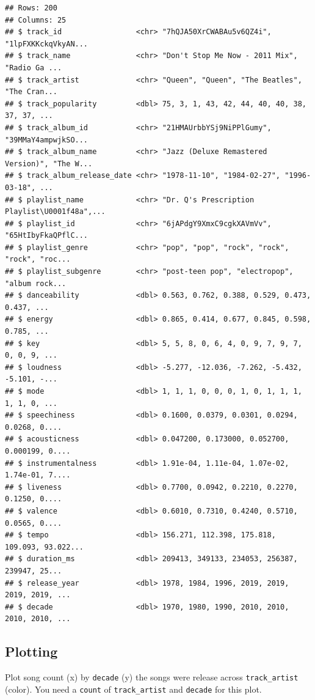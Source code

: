 \documentclass[
]{book}
\begin{document}
\begin{verbatim}
## Rows: 200
## Columns: 25
## $ track_id                 <chr> "7hQJA50XrCWABAu5v6QZ4i", "1lpFXKKckqVkyAN...
## $ track_name               <chr> "Don't Stop Me Now - 2011 Mix", "Radio Ga ...
## $ track_artist             <chr> "Queen", "Queen", "The Beatles", "The Cran...
## $ track_popularity         <dbl> 75, 3, 1, 43, 42, 44, 40, 40, 38, 37, 37, ...
## $ track_album_id           <chr> "21HMAUrbbYSj9NiPPlGumy", "39MMaY4ampwjkSO...
## $ track_album_name         <chr> "Jazz (Deluxe Remastered Version)", "The W...
## $ track_album_release_date <chr> "1978-11-10", "1984-02-27", "1996-03-18", ...
## $ playlist_name            <chr> "Dr. Q's Prescription Playlist\U0001f48a",...
## $ playlist_id              <chr> "6jAPdgY9XmxC9cgkXAVmVv", "65HtIbyFkaQPflC...
## $ playlist_genre           <chr> "pop", "pop", "rock", "rock", "rock", "roc...
## $ playlist_subgenre        <chr> "post-teen pop", "electropop", "album rock...
## $ danceability             <dbl> 0.563, 0.762, 0.388, 0.529, 0.473, 0.437, ...
## $ energy                   <dbl> 0.865, 0.414, 0.677, 0.845, 0.598, 0.785, ...
## $ key                      <dbl> 5, 5, 8, 0, 6, 4, 0, 9, 7, 9, 7, 0, 0, 9, ...
## $ loudness                 <dbl> -5.277, -12.036, -7.262, -5.432, -5.101, -...
## $ mode                     <dbl> 1, 1, 1, 0, 0, 0, 1, 0, 1, 1, 1, 1, 1, 0, ...
## $ speechiness              <dbl> 0.1600, 0.0379, 0.0301, 0.0294, 0.0268, 0....
## $ acousticness             <dbl> 0.047200, 0.173000, 0.052700, 0.000199, 0....
## $ instrumentalness         <dbl> 1.91e-04, 1.11e-04, 1.07e-02, 1.74e-01, 7....
## $ liveness                 <dbl> 0.7700, 0.0942, 0.2210, 0.2270, 0.1250, 0....
## $ valence                  <dbl> 0.6010, 0.7310, 0.4240, 0.5710, 0.0565, 0....
## $ tempo                    <dbl> 156.271, 112.398, 175.818, 109.093, 93.022...
## $ duration_ms              <dbl> 209413, 349133, 234053, 256387, 239947, 25...
## $ release_year             <dbl> 1978, 1984, 1996, 2019, 2019, 2019, 2019, ...
## $ decade                   <dbl> 1970, 1980, 1990, 2010, 2010, 2010, 2010, ...
\end{verbatim}

\hypertarget{plotting}{%
\subsection{Plotting}\label{plotting}}

Plot song count (x) by \texttt{decade} (y) the songs were release across \texttt{track\_artist} (color). You need a \texttt{count} of \texttt{track\_artist} and \texttt{decade} for this plot.
\end{document}
